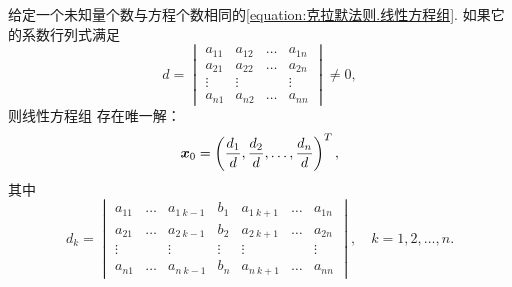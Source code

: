 \begin{theorem}[克拉默法则]\label{theorem:线性方程组.克拉默法则}
给定一个未知量个数与方程个数相同的\cref{equation:克拉默法则.线性方程组}.
如果它的系数行列式满足\begin{equation*}
	d
	=\begin{vmatrix}
		a_{11} & a_{12} & \dots & a_{1n} \\
		a_{21} & a_{22} & \dots & a_{2n} \\
		\vdots & \vdots & & \vdots \\
		a_{n1} & a_{n2} & \dots & a_{nn}
	\end{vmatrix}
	\neq 0,
\end{equation*}
则线性方程组  存在唯一解：
\begin{equation}
	\boldsymbol{x}_0
	= \left( \frac{d_1}{d},\frac{d_2}{d},\dotsc,\frac{d_n}{d} \right)^T,
\end{equation}
其中\begin{equation}
	d_k
	= \begin{vmatrix}
		a_{11} & \dots & a_{1\ k-1} & b_1 & a_{1\ k+1} & \dots & a_{1n} \\
		a_{21} & \dots & a_{2\ k-1} & b_2 & a_{2\ k+1} & \dots & a_{2n} \\
		\vdots & & \vdots & \vdots & \vdots & & \vdots \\
		a_{n1} & \dots & a_{n\ k-1} & b_n & a_{n\ k+1} & \dots & a_{nn}
	\end{vmatrix},
	\quad k=1,2,\dotsc,n.
\end{equation}

\end{theorem}
